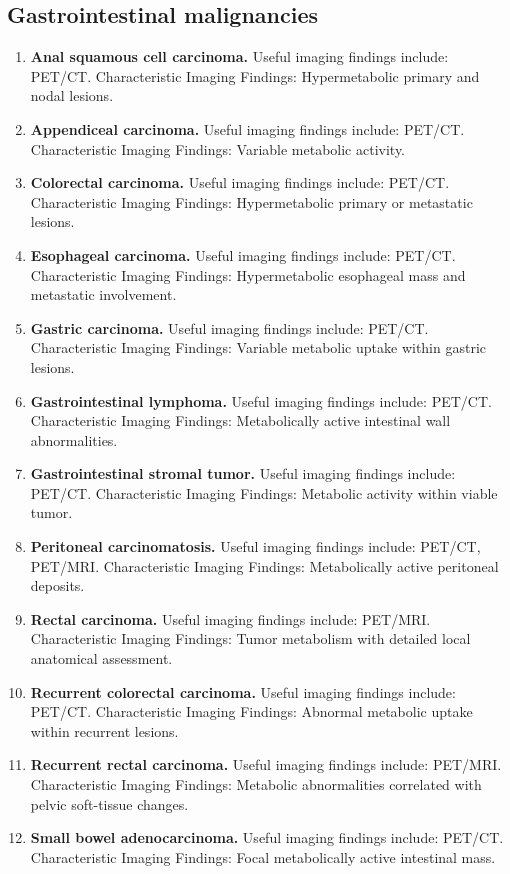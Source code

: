 \subsection{Gastrointestinal malignancies}
\begin{enumerate}[leftmargin=*,itemsep=0.45em,topsep=0.4em]
\item \textbf{Anal squamous cell carcinoma.} Useful imaging findings include: PET/CT. Characteristic Imaging Findings: Hypermetabolic primary and nodal lesions.
\item \textbf{Appendiceal carcinoma.} Useful imaging findings include: PET/CT. Characteristic Imaging Findings: Variable metabolic activity.
\item \textbf{Colorectal carcinoma.} Useful imaging findings include: PET/CT. Characteristic Imaging Findings: Hypermetabolic primary or metastatic lesions.
\item \textbf{Esophageal carcinoma.} Useful imaging findings include: PET/CT. Characteristic Imaging Findings: Hypermetabolic esophageal mass and metastatic involvement.
\item \textbf{Gastric carcinoma.} Useful imaging findings include: PET/CT. Characteristic Imaging Findings: Variable metabolic uptake within gastric lesions.
\item \textbf{Gastrointestinal lymphoma.} Useful imaging findings include: PET/CT. Characteristic Imaging Findings: Metabolically active intestinal wall abnormalities.
\item \textbf{Gastrointestinal stromal tumor.} Useful imaging findings include: PET/CT. Characteristic Imaging Findings: Metabolic activity within viable tumor.
\item \textbf{Peritoneal carcinomatosis.} Useful imaging findings include: PET/CT, PET/MRI. Characteristic Imaging Findings: Metabolically active peritoneal deposits.
\item \textbf{Rectal carcinoma.} Useful imaging findings include: PET/MRI. Characteristic Imaging Findings: Tumor metabolism with detailed local anatomical assessment.
\item \textbf{Recurrent colorectal carcinoma.} Useful imaging findings include: PET/CT. Characteristic Imaging Findings: Abnormal metabolic uptake within recurrent lesions.
\item \textbf{Recurrent rectal carcinoma.} Useful imaging findings include: PET/MRI. Characteristic Imaging Findings: Metabolic abnormalities correlated with pelvic soft-tissue changes.
\item \textbf{Small bowel adenocarcinoma.} Useful imaging findings include: PET/CT. Characteristic Imaging Findings: Focal metabolically active intestinal mass.
\end{enumerate}

